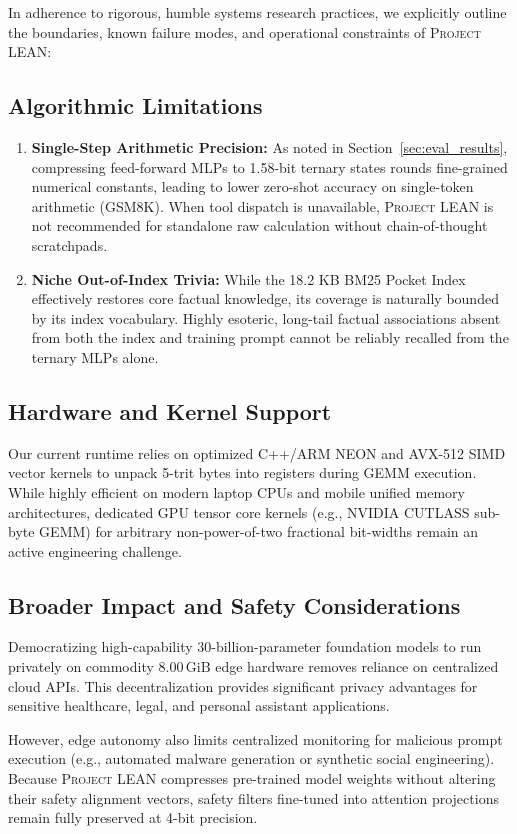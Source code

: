 \documentclass[10pt,twocolumn,letterpaper]{article}
\newcommand{\systemname}{\textsc{Project LEAN}}
\begin{document}
In adherence to rigorous, humble systems research practices, we explicitly outline the boundaries, known failure modes, and operational constraints of \systemname{}:

\subsection{Algorithmic Limitations}
\begin{enumerate}[leftmargin=*]
    \item \textbf{Single-Step Arithmetic Precision:} As noted in Section~\ref{sec:eval_results}, compressing feed-forward MLPs to 1.58-bit ternary states rounds fine-grained numerical constants, leading to lower zero-shot accuracy on single-token arithmetic (GSM8K). When tool dispatch is unavailable, \systemname{} is not recommended for standalone raw calculation without chain-of-thought scratchpads.
    \item \textbf{Niche Out-of-Index Trivia:} While the 18.2 KB BM25 Pocket Index effectively restores core factual knowledge, its coverage is naturally bounded by its index vocabulary. Highly esoteric, long-tail factual associations absent from both the index and training prompt cannot be reliably recalled from the ternary MLPs alone.
\end{enumerate}

\subsection{Hardware and Kernel Support}
Our current runtime relies on optimized C++/ARM NEON and AVX-512 SIMD vector kernels to unpack 5-trit bytes into registers during GEMM execution. While highly efficient on modern laptop CPUs and mobile unified memory architectures, dedicated GPU tensor core kernels (e.g., NVIDIA CUTLASS sub-byte GEMM) for arbitrary non-power-of-two fractional bit-widths remain an active engineering challenge.

\subsection{Broader Impact and Safety Considerations}
Democratizing high-capability 30-billion-parameter foundation models to run privately on commodity $8.00\,\text{GiB}$ edge hardware removes reliance on centralized cloud APIs. This decentralization provides significant privacy advantages for sensitive healthcare, legal, and personal assistant applications. 

However, edge autonomy also limits centralized monitoring for malicious prompt execution (e.g., automated malware generation or synthetic social engineering). Because \systemname{} compresses pre-trained model weights without altering their safety alignment vectors, safety filters fine-tuned into attention projections remain fully preserved at 4-bit precision.
\end{document}
